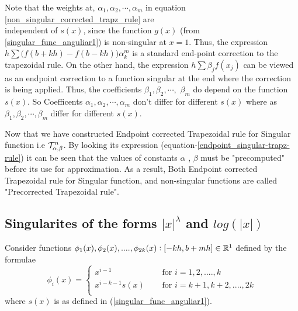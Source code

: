 \documentclass[../document.tex]{subfiles}
\begin{document}
	
	\begin{remark}	
		Note that the weights at, $\alpha_1,\alpha_2, \cdots ,\alpha_m$ in equation \eqref{non_singular_corrected_trapz_rule} are \\ independent of $s(x)$, since the function $g(x)$ (from \eqref{singular_func_anguliar1}) is non-singular at $x = 1$. Thus, the expression 	$h \sum 
		\big(f(b+kh) - f(b-kh)\big)		\alpha^m_k $ is a standard end-point correction to the trapezoidal rule. 
		On the other hand, the expression $	h\sum \beta_j f(x_j)$ can be viewed as an endpoint correction to a function singular at
		the end where the correction is being applied. 
		Thus, the coefficients $\beta_1,\beta_2,\cdots,$ $\beta_m$ do depend on
		the function $s(x)$. So Coefficents  $\alpha_1,\alpha_2, \cdots ,\alpha_m$ don't differ for different $s(x)$ where as $\beta_1,\beta_2,\cdots,\beta_m$ differ for different $s(x)$\cite{rokhlin1990end}.\par
	\end{remark}
	
	
	
	
	\begin{remark}
		Now that we have constructed Endpoint corrected Trapezoidal rule for Singular function i.e $\mathcal{T}_{\alpha,\beta}^{n}$. By looking its expression (equation-\eqref{endpoint_singular-trapz-rule}) it can be seen that the values of constants $\alpha$ , $\beta$ must be "precomputed" before its use for approximation. As a result, Both Endpoint corrected Trapezoidal rule for Singular function, and non-singular functions are called "Precorrected Trapezoidal rule".
	\end{remark}
	\subsection{Singularites of the forms $|x|^{\lambda}$ and $log(|x|)$ }
	
	Consider functions $\phi_1(x) , \phi_2(x) , .... ,\phi_{2k}(x):[-kh,b+mh]\in \mathbb{R}^1$ defined by the formulae
	\begin{equation}
		\phi_i(x) = 
		\begin{cases}
			x^{i-1}      &\quad \text{ for } i = 1,2,....,k\\
			x^{i-k-1}s(x) &\quad \text{ for } i=k+1,k+2,....,2k\\ 
		\end{cases}
	\end{equation}	
	where $s(x)$ is as defined in (\ref{singular_func_anguliar1}).
	
\end{document}
